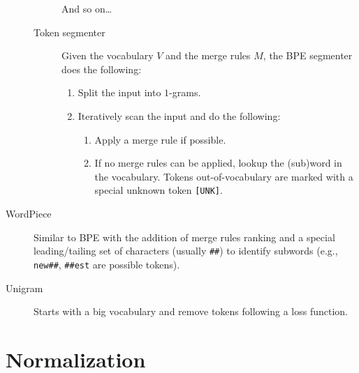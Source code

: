 \begin{description}
\begin{description}
\begin{example}
                    And so on\dots
                \end{example}

            \item[Token segmenter]
                Given the vocabulary $V$ and the merge rules $M$, the BPE segmenter does the following:
                \begin{enumerate}
                    \item Split the input into $1$-grams.
                    \item Iteratively scan the input and do the following:
                    \begin{enumerate}
                        \item Apply a merge rule if possible.
                        \item If no merge rules can be applied, lookup the (sub)word in the vocabulary. Tokens out-of-vocabulary are marked with a special unknown token \texttt{[UNK]}.
                    \end{enumerate}
                \end{enumerate}
        \end{description}

    \item[WordPiece] 
        Similar to BPE with the addition of merge rules ranking and a special leading/tailing set of characters (usually \texttt{\#\#}) to identify subwords (e.g., \texttt{new\#\#}, \texttt{\#\#est} are possible tokens).

    \item[Unigram] 
        Starts with a big vocabulary and remove tokens following a loss function.
\end{description}



\section{Normalization}

